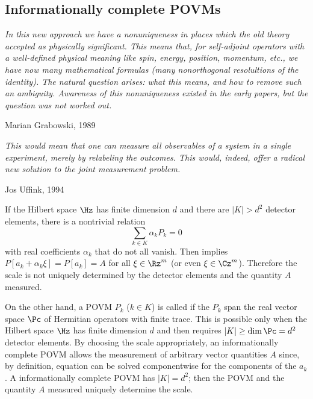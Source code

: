 \documentclass[12pt]{article}
\begin{document}
\subsection{Informationally complete POVMs} \label{ss.ic}

\nopagebreak
\hfill\parbox[t]{10.8cm}{\footnotesize

{\em
In this new approach we have a nonuniqueness in places which the old
theory accepted as physically significant. This means that, for
self-adjoint operators with a well-defined physical meaning like spin,
energy, position, momentum, etc., we have now many mathematical formulas
(many nonorthogonal resolultions of the identity). The natural question
arises: what this means, and how to remove such an ambiguity.
Awareness of this nonuniqueness existed in the early papers, but the
question was not worked out.}

\hfill Marian Grabowski, 1989 \cite[p.925]{Grabow}
}

\bigskip

\nopagebreak
\hfill\parbox[t]{10.8cm}{\footnotesize

{\em
This would mean that one can measure all observables of a system in a
single experiment, merely by relabeling the outcomes. This would,
indeed, offer a radical new solution to the joint measurement problem.}

\hfill Jos Uffink, 1994 \cite[p.207]{Uff1994}
}

\bigskip

If the Hilbert space $\Hz$ has finite dimension $d$ and there are
$|K|>d^2$ detector elements, there is a nontrivial relation
\[
\sum_{k\in K} \alpha_kP_k=0
\]
with real coefficients $\alpha_k$ that do not all vanish. Then
 implies $P[a_k+\alpha_k\xi]=P[a_k]=A$ for all $\xi\in \Rz^m$
(or even $\xi\in \Cz^m$). Therefore  the scale is not uniquely
determined by the detector elements and the quantity $A$ measured.

On the other hand, a POVM $P_k$ ($k\in K$) is called
 if the $P_k$ span the real vector space
$\Pc$ of Hermitian operators with finite trace. This is possible only
when the Hilbert space $\Hz$ has finite dimension $d$ and then requires
$|K|\ge \dim \Pc =d^2$ detector elements. By choosing
the scale appropriately, an informationally complete POVM allows the
measurement of arbitrary vector quantities $A$ since, by definition,
equation  can be solved componentwise for the components of
the $a_k$.
A  informationally complete POVM has $|K|=d^2$; then the
POVM and the quantity $A$ measured uniquely determine the scale.
\end{document}
